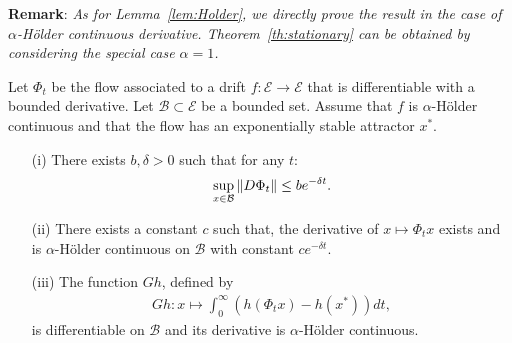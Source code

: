 \documentclass[sigconf]{acmart}
\newcommand\E{\mathcal{E}}
\newcommand\calB{\mathcal{B}}
\newcommand\norm[1]{{\mathchoice{\bnorm{#1}}{\snorm{#1}}{\snorm{#1}}{\snorm{#1}}}}
\newcommand\bnorm[1]{\left\|#1\right\|}
\newcommand\snorm[1]{\|#1\|}
\newcommand\p[1]{\left(#1\right)}
\begin{document}
\textbf{Remark}: \emph{As for Lemma~\ref{lem:Holder}, we directly
  prove the result in the case of $\alpha$-Hölder continuous
  derivative.  Theorem~\ref{th:stationary} can be obtained by
  considering the special case $\alpha=1$. } \medskip

\begin{lemma}
  \label{lem:proof_ss} 
  Let $\Phi_t$ be the flow associated to a drift $f:\E\to\E$ that is
  differentiable with a bounded derivative. Let $\calB\subset\E$ be a
  bounded set. Assume that $f$ is $\alpha$-Hölder continuous and that
  the flow has an exponentially stable attractor $x^*$.
  \begin{itemize}
  \item[(i)] There exists $b,\delta>0$ such that for any $t$:
    \begin{align*}
      \sup_{x\in\calB}\norm{D\Phi_t}\le be^{-\delta t}. 
    \end{align*}
  \item[(ii)] There exists a constant $c$ such that, the derivative of
    $x\mapsto\Phi_tx$ exists and is $\alpha$-Hölder continuous on
    $\calB$ with constant $ce^{-\delta t}$.
  \item[(iii)] The function $Gh$, defined by 
    \begin{align*}
      Gh : x\mapsto \int_0^\infty \p{h(\Phi_t x)-h(x^*)}dt, 
    \end{align*}
    is differentiable on $\calB$ and its derivative is $\alpha$-Hölder
    continuous.
  \end{itemize}
\end{lemma}
\end{document}
